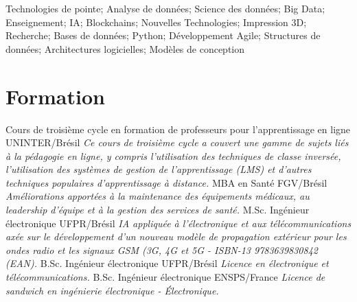 \documentclass[letterpaper]{twentysecondcv} %
\begin{document}
Technologies de pointe;
Analyse de données;
Science des données;
Big Data;
Enseignement;
IA;
\newline
Blockchains;
Nouvelles Technologies;
Impression 3D;
Recherche;
Bases de données;
\newline
Python;
Développement Agile;
Structures de données;
Architectures logicielles;
\newline
Modèles de conception


\section{Formation}

\begin{twenty} %
						{\normalfont Cours de troisième cycle en formation de professeurs pour
						l'apprentissage en ligne}
						{UNINTER/Brésil}
						{\emph{Ce cours de troisième cycle a couvert une gamme de sujets liés à la pédagogie en ligne, y compris l'utilisation des techniques de classe inversée, l'utilisation des systèmes de gestion de l'apprentissage (LMS) et d'autres techniques populaires d'apprentissage à distance.}}
						{MBA en Santé}
						{FGV/Brésil}
						{\emph{Améliorations apportées à la maintenance des équipements médicaux, au leadership d'équipe et à la gestion des services de santé.}}
						{M.Sc. Ingénieur électronique}
						{UFPR/Brésil}
						{\emph{IA appliquée à l'électronique et aux télécommunications axée sur le développement d'un nouveau modèle de propagation extérieur pour les ondes radio et les signaux GSM (3G, 4G et 5G - ISBN-13 9783639830842 (EAN).}}
						{B.Sc. Ingénieur électronique}
						{UFPR/Brésil}
						{\emph{Licence en électronique et télécommunications.}}
						{B.Sc. Ingénieur électronique}
						{ENSPS/France}
						{\emph{Licence de sandwich en ingénierie électronique - Électronique.}}
\end{twenty}

\end{document}
